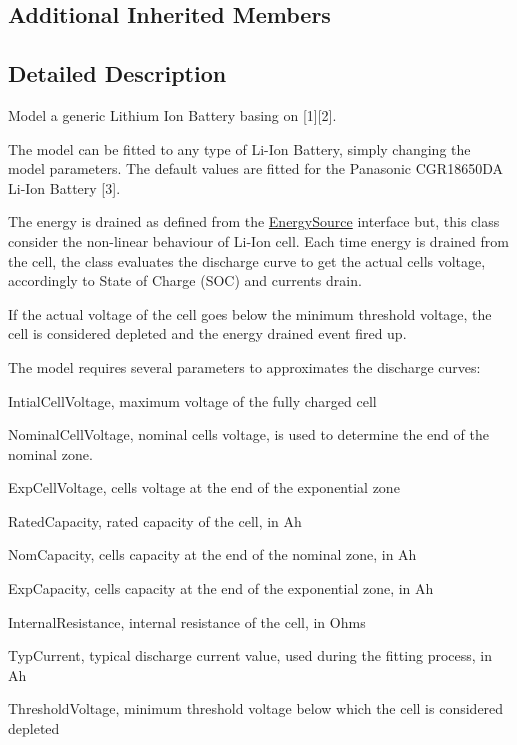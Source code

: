 \subsection*{Additional Inherited Members}


\subsection{Detailed Description}
Model a generic Lithium Ion Battery basing on \mbox{[}1\mbox{]}\mbox{[}2\mbox{]}. 

The model can be fitted to any type of Li-\/\+Ion Battery, simply changing the model parameters. The default values are fitted for the Panasonic C\+G\+R18650\+DA Li-\/\+Ion Battery \mbox{[}3\mbox{]}.

The energy is drained as defined from the \hyperlink{classns3_1_1EnergySource}{Energy\+Source} interface but, this class consider the non-\/linear behaviour of Li-\/\+Ion cell. Each time energy is drained from the cell, the class evaluates the discharge curve to get the actual cell\textquotesingle{}s voltage, accordingly to State of Charge (S\+OC) and current\textquotesingle{}s drain.

If the actual voltage of the cell goes below the minimum threshold voltage, the cell is considered depleted and the energy drained event fired up.

The model requires several parameters to approximates the discharge curves\+:
\begin{DoxyItemize}
\item Intial\+Cell\+Voltage, maximum voltage of the fully charged cell
\item Nominal\+Cell\+Voltage, nominal cell\textquotesingle{}s voltage, is used to determine the end of the nominal zone.
\item Exp\+Cell\+Voltage, cell\textquotesingle{}s voltage at the end of the exponential zone
\item Rated\+Capacity, rated capacity of the cell, in Ah
\item Nom\+Capacity, cell\textquotesingle{}s capacity at the end of the nominal zone, in Ah
\item Exp\+Capacity, cell\textquotesingle{}s capacity at the end of the exponential zone, in Ah
\item Internal\+Resistance, internal resistance of the cell, in Ohms
\item Typ\+Current, typical discharge current value, used during the fitting process, in Ah
\item Threshold\+Voltage, minimum threshold voltage below which the cell is considered depleted
\end{DoxyItemize}

